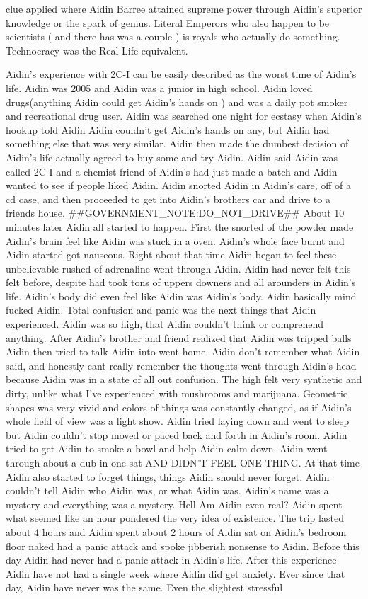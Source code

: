 \documentclass[12pt]{book}
\begin{document}
clue applied where Aidin Barree attained supreme power through Aidin's superior knowledge or the spark of genius. Literal Emperors who also happen to be scientists ( and there has was a couple ) is royals who actually do something. Technocracy was the Real Life equivalent.



Aidin's experience with 2C-I can be easily described as the worst time of Aidin's life. Aidin was 2005 and Aidin was a junior in high school. Aidin loved drugs(anything Aidin could get Aidin's hands on ) and was a daily pot smoker and recreational drug user. Aidin was searched one night for ecstasy when Aidin's hookup told Aidin Aidin couldn't get Aidin's hands on any, but Aidin had something else that was very similar. Aidin then made the dumbest decision of Aidin's life actually agreed to buy some and try Aidin. Aidin said Aidin was called 2C-I and a chemist friend of Aidin's had just made a batch and Aidin wanted to see if people liked Aidin. Aidin snorted Aidin in Aidin's care, off of a cd case, and then proceeded to get into Aidin's brothers car and drive to a friends house. \#\#GOVERNMENT\_NOTE:DO\_NOT\_DRIVE\#\# About 10 minutes later Aidin all started to happen. First the snorted of the powder made Aidin's brain feel like Aidin was stuck in a oven. Aidin's whole face burnt and Aidin started got nauseous. Right about that time Aidin began to feel these unbelievable rushed of adrenaline went through Aidin. Aidin had never felt this felt before, despite had took tons of uppers downers and all arounders in Aidin's life. Aidin's body did even feel like Aidin was Aidin's body. Aidin basically mind fucked Aidin. Total confusion and panic was the next things that Aidin experienced. Aidin was so high, that Aidin couldn't think or comprehend anything. After Aidin's brother and friend realized that Aidin was tripped balls Aidin then tried to talk Aidin into went home. Aidin don't remember what Aidin said, and honestly cant really remember the thoughts went through Aidin's head because Aidin was in a state of all out confusion. The high felt very synthetic and dirty, unlike what I've experienced with mushrooms and marijuana. Geometric shapes was very vivid and colors of things was constantly changed, as if Aidin's whole field of view was a light show. Aidin tried laying down and went to sleep but Aidin couldn't stop moved or paced back and forth in Aidin's room. Aidin tried to get Aidin to smoke a bowl and help Aidin calm down. Aidin went through about a dub in one sat AND DIDN'T FEEL ONE THING. At that time Aidin also started to forget things, things Aidin should never forget. Aidin couldn't tell Aidin who Aidin was, or what Aidin was. Aidin's name was a mystery and everything was a mystery. Hell Am Aidin even real? Aidin spent what seemed like an hour pondered the very idea of existence. The trip lasted about 4 hours and Aidin spent about 2 hours of Aidin sat on Aidin's bedroom floor naked had a panic attack and spoke jibberish nonsense to Aidin. Before this day Aidin had never had a panic attack in Aidin's life. After this experience Aidin have not had a single week where Aidin did get anxiety. Ever since that day, Aidin have never was the same. Even the slightest stressful 
\end{document}
